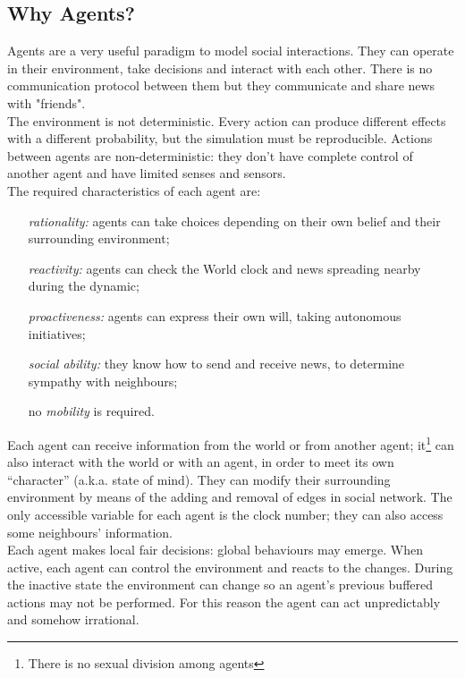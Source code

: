 \subsection{Why Agents?}\label{subsec:whyagents}
Agents are a very useful paradigm to model social
interactions.\cite{axtell2000agents}
They can operate in their environment, take decisions and interact with
each other.
There is no communication protocol between them but they communicate
and share news with "friends".\\
The environment is not deterministic. 
Every action can produce different effects with a different probability,
but the simulation must be reproducible.
Actions between agents are non-deterministic: they don't have complete
control of another agent and have limited senses and sensors.\\
The required characteristics of each agent
are:\cite{wooldridge1995intelligent}
%
\begin{itemize}
\item [\textit {rationality:}] agents can take choices depending on their
  own belief and their surrounding environment;
\item [\textit {reactivity:}] agents can check the World clock and news
  spreading nearby during the dynamic;
\item [\textit {proactiveness:}] agents can express their own will,
  taking autonomous initiatives;
\item [\textit {social ability:}] they know how to send and receive news,
  to determine sympathy with neighbours;
\item [no \textit{mobility}] is required. 
\end{itemize}
%
Each agent can receive information from the world or from another agent;
it\footnote{There is no sexual division among agents} can also interact
with the world or with an agent, in order to meet its own ``character''
(a.k.a. state of mind).
They can modify their surrounding environment by means of the adding
and removal of edges in social network.
The only accessible variable for each agent is the clock number; they
can also access some neighbours' information.\\
Each agent makes local fair decisions: global behaviours may emerge.
When active, each agent can control the environment and reacts to the changes. 
During the inactive state the environment can change so an agent's previous
buffered actions may not be performed.
For this reason the agent can act unpredictably and somehow irrational.
